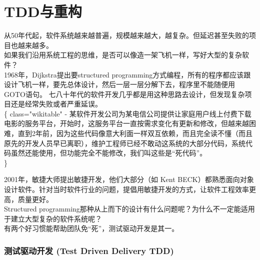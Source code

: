 \chapter{TDD与重构} %

从50年代起，软件系统越来越普遍，规模越来越大，越复杂。但延迟甚至失败的项目也越来越多。\\
如果我们沿用系统工程的思维，是否可以像造一架飞机一样，写好大型的复杂软件？\\
1968年，Dijkstra提出要structured
programming方式编程，所有的程序都应该跟设计飞机一样，要先总体设计，然后一层一层分解下去，程序里不能随便用GOTO语句。
七八十年代的软件开发几乎都是用这种思路去设计，但发现复杂项目还是经常失败或者严重延误。\\
\{\textbar{} class="wikitable" \textbar{}-
\textbar{}某软件开发公司为某电信公司提供让家庭用户线上付费下载电影的服务平台，开始时，这服务平台一直按需求变化有更新和修改，但越来越困难，直到2年前，因为这些代码像意大利面一样双互依赖，而且完全读不懂（而且原先的开发人员早已离职），维护工程师已经不敢动这系统的大部分代码，系统代码虽然还能使用，但功能完全不能修改，我们叫这些是``死代码''。\\
\textbar{}\}

2001年，敏捷大师提出敏捷开发，他们大部分（如 Kent
BECK）都熟悉面向对象设计软件。针对当时软件行业的问题，提倡用敏捷开发的方式，让软件工程效率更高，质量更好。\\
Structured
programming那种从上而下的设计有什么问题呢？为什么不一定能适用于建立大型复杂的软件系统呢？\\
有两个好习惯能帮助团队免``死''，测试驱动开发是其一。

\hypertarget{ux6d4bux8bd5ux9a71ux52a8ux5f00ux53d1-test-driven-delivery-tdd}{%
\subsection{测试驱动开发 (Test Driven Delivery
TDD)}\label{ux6d4bux8bd5ux9a71ux52a8ux5f00ux53d1-test-driven-delivery-tdd}}

